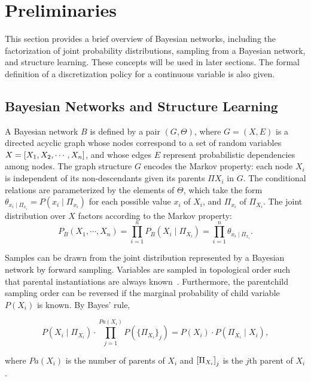 \section{Preliminaries}
\label{sec:preliminaries}
This section provides a brief overview of Bayesian networks, including the factorization of joint probability distributions, sampling from a Bayesian network, and structure learning. These concepts will be used in later sections. The formal definition of a discretization policy for a continuous variable is also given.

\subsection{Bayesian Networks and Structure Learning}

A Bayesian network $B$ is defined by a pair $(G,\Theta)$, where $G = (X,E)$ is a directed acyclic graph whose nodes correspond to a set of random variables $X = \brock{X_1, X_2, \cdots, X_n}$, and whose edges $E$ represent probabilistic dependencies among nodes. The graph structure $G$ encodes the Markov property: each node $X_i$ is independent of its non-descendants given its parents $\Pi{X_i}$ in $G$. The conditional relations are parameterized by the elements of $\Theta$, which take the form $\theta_{x_i \mid \Pi_{x_i}} = P(x_i \mid \Pi_{x_i})$ for each possible value $x_i$ of $X_i$, and $\Pi_{x_i}$ of $\Pi_{X_i}$. The joint distribution over $X$ factors according to the Markov property:
\begin{equation}
P_B (X_1 , \cdots, X_n) = \prod_{i=1}^{n} P_B (X_i \mid \Pi_{X_i}) = \prod_{i=1}^{n} \theta_{x_i \mid \Pi_{x_i}}\text{.}
\end{equation}

Samples can be drawn from the joint distribution represented by a Bayesian network by forward sampling.
Variables are sampled in topological order such that parental instantiations are always known~\citep[see][chap.~22]{algo_2009}.
Furthermore, the parent\rightarrow child sampling order can be reversed if the marginal probability of child variable $P(X_i)$ is known.
By Bayes' rule,

\begin{equation}
P(X_i \mid \Pi_{X_i}) \cdot \prod_{j = 1}^{ Pa( X_i)} P( \{ \Pi_{X_i} \}_j) = P(X_i) \cdot P(\Pi_{X_i} \mid X_i),
\end{equation}

\noindent
where $Pa(X_i)$ is the number of parents of $X_i$ and $\brock{\Pi_{X_i}}_j$ is the $j$th parent of $X_i$.

